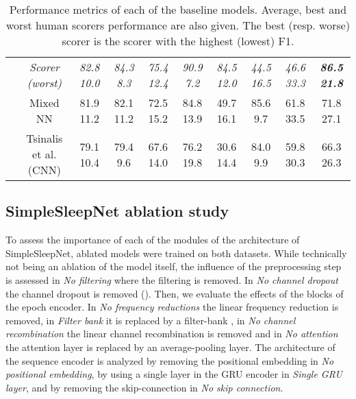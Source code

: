 \documentclass[journal]{IEEEtran}
\begin{document}
\begin{table*}[ht]
{\begin{tabular}{|c|c |c c c|c c c c c|}
  & \textcolor{NavyBlue}{\textit{Scorer (worst)}}  & \textcolor{NavyBlue}{\textit{82.8    10.0}} & \textcolor{NavyBlue}{\textit{84.3     8.3}} & \textcolor{NavyBlue}{\textit{75.4    12.4}} &\textcolor{NavyBlue}{\textit{90.9    7.2}}&\textcolor{NavyBlue}{\textit{84.5    12.0}} &\textcolor{NavyBlue}{\textit{44.5    16.5}} &\textcolor{NavyBlue}{\textit{46.6    33.3}}&\textcolor{NavyBlue}{\textit{\textbf{86.5    21.8}}}\\
  
   & Mixed NN \cite{Dong2018}  & 81.9    11.2 & 82.1    11.2 & 72.5    15.2 &84.8    13.9 &49.7    16.1&85.6    9.7  &61.8    33.5  &71.8    27.1 \\

 & Tsinalis et al. (CNN) \cite{Tsinalis2016a}& 79.1    10.4  & 79.4    9.6   & 67.6    14.0 &76.2    19.8 &30.6    14.4 &84.0    9.9 &59.8    30.3 &66.3    26.3 \\ 
 \hline
\end{tabular}
}
\caption{Performance metrics of each of the baseline models. Average, best and worst human scorers performance are also given. The best (resp. worse) scorer is the scorer with the highest (lowest) F1.}
\label{tab:complete_results}
\vspace{-1.6em}
\end{table*}
 

\subsection{SimpleSleepNet ablation study}
To assess the importance of each of the modules of the architecture of SimpleSleepNet, ablated models were trained on both datasets.
While technically not being an ablation of the model itself, the influence of the preprocessing step is assessed in \textit{No filtering} where the filtering is removed. In \textit{No channel dropout} the channel dropout is removed (). Then, we evaluate the effects of the blocks of the epoch encoder. In \textit{No frequency reductions} the linear frequency reduction is removed, in \textit{Filter bank} it is replaced by a filter-bank \cite{Phan2019}, in \textit{No channel recombination} the linear channel recombination is removed and in \textit{No attention} the attention layer is replaced by an average-pooling layer. The architecture of the sequence encoder is analyzed by removing the positional embedding in \textit{No positional embedding}, by using a single layer in the GRU encoder in \textit{Single GRU layer}, and by removing the skip-connection in \textit{No skip connection}. 
\end{document}
